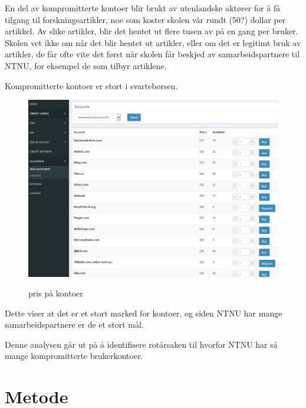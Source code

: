 En del av kompromitterte kontoer blir brukt av utenlandske aktører for å få tilgang til forskningsartikler, noe som koster skolen vår rundt (50?) dollar per artikkel. Av slike artikler, blir det hentet ut flere tusen av på en gang per bruker. Skolen vet ikke om når det blir hentet ut artikler, eller om det er legitimt bruk av artikler, de får ofte vite det først når skolen får beskjed av samarbeidspartnere til NTNU, for eksempel de som tilbyr artiklene. 

Kompromitterte kontoer er stort i svartebørsen. 
\begin{figure}[H]
    \centering
    \includegraphics[scale=0.44en]{case_2/bilder/prislite_kontore.png}
    \label{fig:kjkk}
    \caption[pris_på_kontoer]{pris på kontoer}
\end{figure}

Dette viser at det er et stort marked for kontoer, og siden NTNU har mange samarbeidspartnere er de et stort mål. 


Denne analysen går ut på å identifisere rotårsaken til hvorfor NTNU har så mange kompromitterte brukerkontoer.


\section{Metode}

